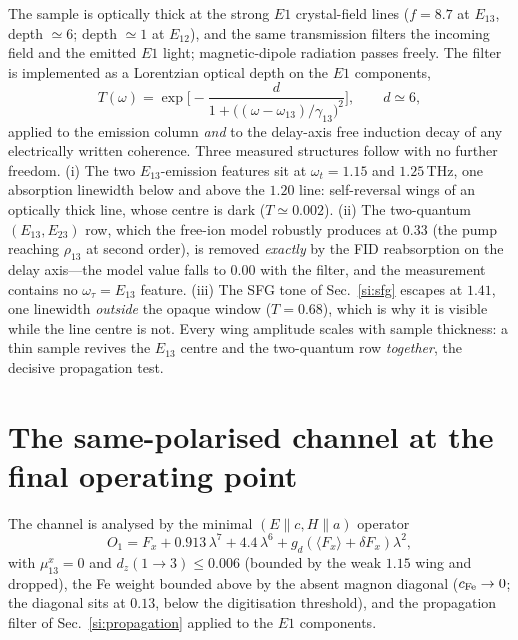 \documentclass[11pt]{article}
\begin{document}
The sample is optically thick at the strong $E1$ crystal-field lines
($f=8.7$ at $E_{13}$, depth $\simeq6$; depth $\simeq1$ at $E_{12}$),
and the same transmission filters the incoming field and the emitted
$E1$ light; magnetic-dipole radiation passes freely.  The filter is
implemented as a Lorentzian optical depth on the $E1$ components,
\begin{equation}
  T(\omega)=\exp\!\Big[-\frac{d}{1+\big((\omega-\omega_{13})/
  \gamma_{13}\big)^{2}}\Big],\qquad d\simeq6,
\end{equation}
applied to the emission column \emph{and} to the delay-axis free
induction decay of any electrically written coherence.  Three measured
structures follow with no further freedom.  (i) The two
$E_{13}$-emission features sit at $\omega_t=1.15$ and $1.25$\,THz, one
absorption linewidth below and above the $1.20$ line: self-reversal
wings of an optically thick line, whose centre is dark
($T\simeq0.002$).  (ii) The two-quantum $(E_{13},E_{23})$ row, which
the free-ion model robustly produces at $0.33$ (the pump reaching
$\rho_{13}$ at second order), is removed \emph{exactly} by the FID
reabsorption on the delay axis---the model value falls to $0.00$ with
the filter, and the measurement contains no $\omega_\tau=E_{13}$
feature.  (iii) The SFG tone of Sec.~\ref{si:sfg} escapes at $1.41$,
one linewidth \emph{outside} the opaque window ($T=0.68$), which is
why it is visible while the line centre is not.  Every wing amplitude
scales with sample thickness: a thin sample revives the $E_{13}$
centre and the two-quantum row \emph{together}, the decisive
propagation test.

\section{The same-polarised channel at the final operating point}
\label{si:samepol}

The channel is analysed by the minimal
$(E\!\parallel\!c,H\!\parallel\!a)$ operator
\begin{equation}
  O_1=F_x+0.913\,\lambda^7+4.4\,\lambda^6
      +g_d(\langle F_x\rangle+\delta F_x)\lambda^2 ,
\end{equation}
with $\mu^x_{13}=0$ and $d_z(1\!\to\!3)\leq0.006$ (bounded by the weak
$1.15$ wing and dropped), the Fe weight bounded above by the absent
magnon diagonal ($c_{\rm Fe}\to0$; the diagonal sits at $0.13$, below
the digitisation threshold), and the propagation filter of
Sec.~\ref{si:propagation} applied to the $E1$ components.
\end{document}
